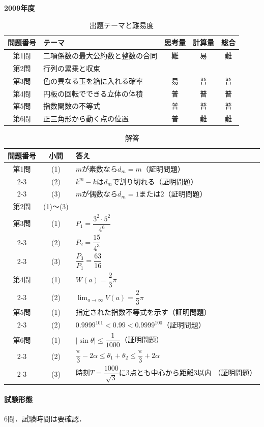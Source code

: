 \documentclass[../../main.tex]{subfiles}
\begin{document}
\begin{center}
  {\fontsize{48pt}{58pt}\selectfont \textbf{2009}\normalsize\textbf{年度}}
\end{center}

\begin{table}[htb]
  \centering
  \caption{出題テーマと難易度}
  \begin{tabular}{|c|p{6.2cm}|c|c|c|}
    \hline
    \textbf{問題番号} & \textbf{テーマ} & \textbf{思考量} & \textbf{計算量} & \textbf{総合} \\
    \hline
    第1問 & 二項係数の最大公約数と整数の合同 & 難 & 易 & 難 \\
    \hline
    第2問 & 行列の累乗と収束 &  &  &  \\
    \hline
    第3問 & 色の異なる玉を箱に入れる確率 & 易 & 普 & 普 \\
    \hline
    第4問 & 円板の回転でできる立体の体積 & 普 & 普 & 普 \\
    \hline
    第5問 & 指数関数の不等式 & 普 & 普 & 普 \\
    \hline
    第6問 & 正三角形から動く点の位置 & 普 & 難 & 難 \\
    \hline
  \end{tabular}
\end{table}

\begin{table}[htb]
  \centering
  \caption{解答}
  \renewcommand{\arraystretch}{1.4}
  \begin{tabular}{|c|c|p{9cm}|}
    \hline
    \textbf{問題番号} & \textbf{小問} & \textbf{答え} \\
    \hline
    第1問 & (1) & $m$が素数なら$d_m=m$（証明問題） \\
    \cline{2-3}
    & (2) & $k^m-k$は$d_m$で割り切れる（証明問題） \\
    \cline{2-3}
    & (3) & $m$が偶数なら$d_m=1$または$2$（証明問題） \\
    \hline
    第2問 & (1)〜(3) & \\
    \hline
    第3問 & (1) & $P_1=\dfrac{3^2\cdot5^2}{4^6}$ \\
    \cline{2-3}
    & (2) & $P_2=\dfrac{15}{4^3}$ \\
    \cline{2-3}
    & (3) & $\dfrac{P_3}{P_1}=\dfrac{63}{16}$ \\
    \hline
    第4問 & (1) & $W(a)=\dfrac{2}{3}\pi$ \\
    \cline{2-3}
    & (2) & $\displaystyle\lim_{a\to\infty}V(a)=\dfrac{2}{3}\pi$ \\
    \hline
    第5問 & (1) & 指定された指数不等式を示す（証明問題） \\
    \cline{2-3}
    & (2) & $0.9999^{101}<0.99<0.9999^{100}$（証明問題） \\
    \hline
    第6問 & (1) & $|\sin\theta|\le\dfrac{1}{1000}$（証明問題） \\
    \cline{2-3}
    & (2) & $\dfrac{\pi}{3}-2\alpha\le\theta_1+\theta_2
    \le\dfrac{\pi}{3}+2\alpha$ \\
    \cline{2-3}
    & (3) & 時刻$T=\dfrac{1000}{\sqrt{3}}$に3点とも中心から距離$3$以内
    （証明問題） \\
    \hline
  \end{tabular}
\end{table}

\paragraph{試験形態}
6問．試験時間は要確認．
\end{document}
